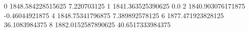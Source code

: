 0 1848.584228515625 7.220703125
1 1841.363525390625 0.0
2 1840.903076171875 -0.46044921875
4 1848.75341796875 7.389892578125
6 1877.471923828125 36.1083984375
8 1882.0152587890625 40.6517333984375
